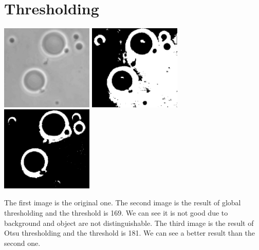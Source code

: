 \documentclass{article}
\begin{document}
\section{Thresholding}

\includegraphics[width=0.33\textwidth]{../data/polymersomes.jpg}
\includegraphics[width=0.33\textwidth]{../data/global_polymersomes.jpg}
\includegraphics[width=0.33\textwidth]{../data/otsu_polymersomes.jpg}

The first image is the original one. The second image is the result of global thresholding and the threshold is 169. We can see it is not good due to background and object are not distinguishable. The third image is the result of Otsu thresholding and the threshold is 181. We can see a better result than the second one.
\end{document}
